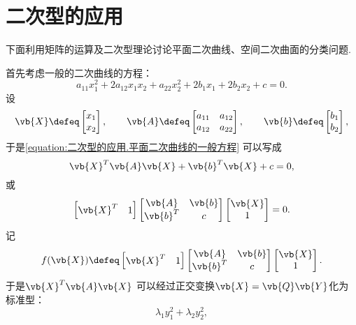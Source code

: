 \section{二次型的应用}
下面利用矩阵的运算及二次型理论讨论平面二次曲线、空间二次曲面的分类问题.

首先考虑一般的二次曲线的方程：\begin{equation}\label{equation:二次型的应用.平面二次曲线的一般方程}
	a_{11} x_1^2
	+ 2 a_{12} x_1 x_2
	+ a_{22} x_2^2
	+ 2 b_1 x_1
	+ 2 b_2 x_2
	+ c
	= 0.
\end{equation}
设\[
	\vb{X}
	\defeq \begin{bmatrix}
		x_1 \\ x_2
	\end{bmatrix},
	\qquad
	\vb{A}
	\defeq \begin{bmatrix}
		a_{11} & a_{12} \\
		a_{12} & a_{22}
	\end{bmatrix},
	\qquad
	\vb{b}
	\defeq \begin{bmatrix}
		b_1 \\ b_2
	\end{bmatrix},
\]
于是\cref{equation:二次型的应用.平面二次曲线的一般方程} 可以写成\[
	\vb{X}^T \vb{A} \vb{X}
	+ \vb{b}^T \vb{X}
	+ c
	= 0,
\]
或\begin{equation}\label{equation:二次型的应用.平面二次曲线的一般方程.矩阵形式}
	\begin{bmatrix}
		\vb{X}^T & 1
	\end{bmatrix}
	\begin{bmatrix}
		\vb{A} & \vb{b} \\
		\vb{b}^T & c
	\end{bmatrix}
	\begin{bmatrix}
		\vb{X} \\ 1
	\end{bmatrix}
	= 0.
\end{equation}
记\[
	f(\vb{X})
	\defeq
	\begin{bmatrix}
		\vb{X}^T & 1
	\end{bmatrix}
	\begin{bmatrix}
		\vb{A} & \vb{b} \\
		\vb{b}^T & c
	\end{bmatrix}
	\begin{bmatrix}
		\vb{X} \\ 1
	\end{bmatrix}.
\]
于是\(\vb{X}^T \vb{A} \vb{X}\)
可以经过正交变换\(\vb{X} = \vb{Q} \vb{Y}\)化为标准型：\[
	\lambda_1 y_1^2 + \lambda_2 y_2^2,
\]
